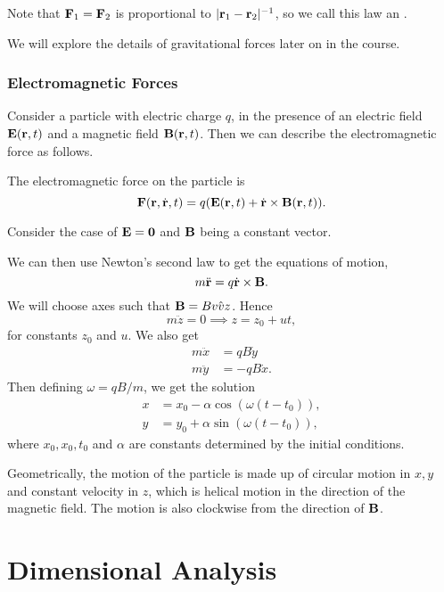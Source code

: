 \documentclass[a4paper]{scrreprt}
\begin{document}
Note that $\mathbf{F}_1 = \mathbf{F}_2$ is proportional to $|\mathbf{r}_1 - \mathbf{r}_2|^{-1}$, so we call this law an .

We will explore the details of gravitational forces later on in the course.

\subsection{Electromagnetic Forces}

Consider a particle with electric charge $q$, in the presence of an electric field $\mathbf{E}(\mathbf{r}, t)$ and a magnetic field $\mathbf{B}(\mathbf{r}, t)$. Then we can describe the electromagnetic force as follows.

\begin{law*}
	The electromagnetic force on the particle is
	$$
	\mathbf{F}(\mathbf{r}, \dot{\mathbf{r}}, t) = q(\mathbf{E}(\mathbf{r}, t) + \dot{\mathbf{r}} \times \mathbf{B}(\mathbf{r}, t)).
	$$
\end{law*}

\begin{example}
	Consider the case of $\mathbf{E} = \mathbf{0}$ and $\mathbf{B}$ being a constant vector.

	We can then use Newton's second law to get the equations of motion,
	$$
	m \ddot{\mathbf{r}} = q \dot{\mathbf{r}} \times \mathbf{B}.
	$$
	We will choose axes such that $\mathbf{B} = B \hat{vv{z}}$. Hence
	$$
	m \ddot{z} = 0 \implies z = z_0 + ut,
	$$
	for constants $z_0$ and $u$. We also get
	\begin{align*}
		m \ddot{x} &= qB \dot{y}\\
		m \ddot{y} &= -qB \dot{x}.
	\end{align*}
	Then defining $\omega  = qB/m$, we get the solution
	\begin{align*}
		x &= x_0 - \alpha \cos (\omega(t - t_0)),\\
		y &= y_0 + \alpha \sin(\omega(t - t_0)),
	\end{align*}
	where $x_0, x_0, t_0$ and $\alpha$ are constants determined by the initial conditions.

	Geometrically, the motion of the particle is made up of circular motion in $x, y$ and constant velocity in $z$, which is helical motion in the direction of the magnetic field. The motion is also clockwise from the direction of $\mathbf{B}$.
\end{example}

\chapter{Dimensional Analysis}
\end{document}
